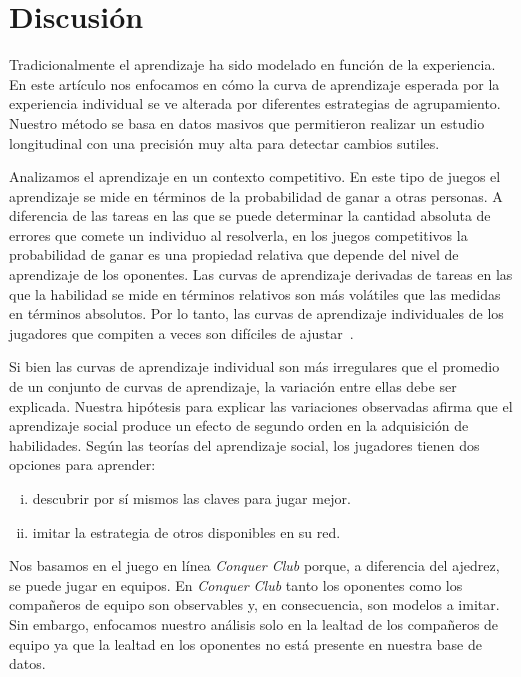 \documentclass[a4paper,11pt]{book}
\theoremstyle{definition}
\begin{document}
\section{Discusi\'on}

Tradicionalmente el aprendizaje ha sido modelado en funci\'on de la experiencia.
%
En este art\'iculo nos enfocamos en c\'omo la curva de aprendizaje esperada por la experiencia individual se ve alterada por diferentes estrategias de agrupamiento.
%
Nuestro m\'etodo se basa en datos masivos que permitieron realizar un estudio longitudinal con una precisi\'on muy alta para detectar cambios sutiles.


Analizamos el aprendizaje en un contexto competitivo.
%
En este tipo de juegos el aprendizaje se mide en t\'erminos de la probabilidad de ganar a otras personas.
%
A diferencia de las tareas en las que se puede determinar la cantidad absoluta de errores que comete un individuo al resolverla, en los juegos competitivos la probabilidad de ganar es una propiedad relativa que depende del nivel de aprendizaje de los oponentes.
%
Las curvas de aprendizaje derivadas de tareas en las que la habilidad se mide en t\'erminos relativos son m\'as vol\'atiles que las medidas en t\'erminos absolutos.
%
Por lo tanto, las curvas de aprendizaje individuales de los jugadores que compiten a veces son dif\'iciles de ajustar~\cite{howard2014-learningCurvesChessPlayersATestOfPowerLawGenerality,Gaschler2014}.


Si bien las curvas de aprendizaje individual son m\'as irregulares que el promedio de un conjunto de curvas de aprendizaje, la variaci\'on entre ellas debe ser explicada.
%
Nuestra hip\'otesis para explicar las variaciones observadas afirma que el aprendizaje social produce un efecto de segundo orden en la adquisici\'on de habilidades.
%
Seg\'un las teor\'ias del aprendizaje social, los jugadores tienen dos opciones para aprender: 
\begin{enumerate}[i)]
\item descubrir por s\'i mismos las claves para jugar mejor.
\item imitar la estrategia de otros disponibles en su red.
\end{enumerate}

Nos basamos en el juego en l\'inea \emph{Conquer Club} porque, a diferencia del ajedrez, se puede jugar en equipos.
%
En \emph{Conquer Club} tanto los oponentes como los compa\~neros de equipo son observables y, en consecuencia, son modelos a imitar.
%
Sin embargo, enfocamos nuestro an\'alisis solo en la lealtad de los compa\~neros de equipo ya que la lealtad en los oponentes no est\'a presente en nuestra base de datos.
\end{document}
